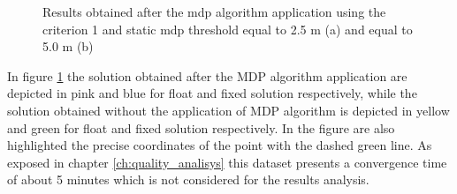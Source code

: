 \begin{figure}[H] 
	\centering
    \caption{Results obtained after the mdp algorithm application using the criterion 1 and static mdp threshold equal to 2.5 m (a) and equal to 5.0 m (b)}
	\label{FIG:test4mdp_crit1mdpstaticall} 
\end{figure}

In figure \ref{FIG:test4mdp_crit1mdpstaticall} the solution obtained after the MDP algorithm application are depicted in pink and blue for float and fixed solution respectively, while the solution obtained without the application of MDP algorithm is depicted in yellow and green for float and fixed solution respectively. In the figure are also highlighted the precise coordinates of the point with the dashed green line. As exposed in chapter \ref{ch:quality_analisys} this dataset presents a convergence time of about 5 minutes which is not considered for the results analysis. 

